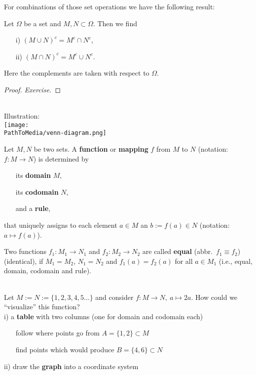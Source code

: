 \begin{frame}
For combinations of those set operations we have the following result: \vspace{-0.2cm}
 \begin{lemma}\label{lem:demorgan}
 	Let $\Omega$ be a set and $M,N \subset \Omega$. Then we find
 	\begin{itemize}
 		\item[i)] $ (M\cup N)^c  = M^c \cap N^c $,
 		\item[ii)] $ (M\cap N )^c =  M^c \cup  N^c $.
 	\end{itemize}
 Here the complements are taken with respect to $\Omega$.
 \end{lemma}\vspace{-0.5cm}
 \begin{proof}
 	\textit{Exercise.}
 \end{proof}
{
	\blank
	~\\
	Illustration:\\
	\texttt{[image: \\PathToMedia/venn-diagram.png]}
}
\end{frame}
 
\begin{frame}
\begin{defi}\label{def:function}
	Let $M, N$ be two sets. A \textbf{function} or \textbf{mapping} $f$ from $M$ to $N$ (notation: $f\colon M\to N$) is determined by
	\begin{itemize}
		\item[] its \textbf{domain} $M$, 
		\item[] its \textbf{codomain} $N$,
		\item[] and a \textbf{rule},
	\end{itemize} 
that uniquely assigns to each element $a\in M$ an $b:=f(a)\in N$ (notation: $a \mapsto f(a)$).	 
\end{defi}
Two functions $f_1: M_1\to N_1$ and $f_2: M_2\to N_2$ are called \textbf{equal} (abbr.~$f_1\equiv f_2$) (identical),
if $M_1=M_2$, $N_1=N_2$ and $f_1(a)=f_2(a)$ for all $a\in M_1$ (i.e., equal, domain, codomain and rule).
%
	
\vspace{0.4cm}
\begin{ex}\label{ex:image_preimage_graph}
	~\\
	\blank
	Let $M := N :=\{1,2,3,4,5\ldots\}$ and consider $f\colon M \to N,~ a \mapsto 2a$. How could we ``visualize'' this function?\\ \vspace{0.2cm}
	i) a \textbf{table} with two columns (one for domain and codomain each)
	\begin{itemize}
		\blank
		\item[] follow where points go from $A=\{1,2\}\subset M$ 
		\item[] find points which would produce $B=\{4,6\} \subset N$
	\end{itemize}\vspace{0.2cm}
	ii) draw the \textbf{graph} into a coordinate system
\end{ex}
\end{frame}

